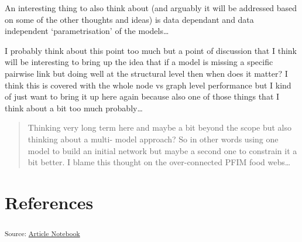 \documentclass[
  letterpaper,
  DIV=11,
  numbers=noendperiod]{scrartcl}
\begin{document}
An interesting thing to also think about (and arguably it will be
addressed based on some of the other thoughts and ideas) is data
dependant and data independent `parametrisation' of the models\ldots{}

I probably think about this point too much but a point of discussion
that I think will be interesting to bring up the idea that if a model is
missing a specific pairwise link but doing well at the structural level
then when does it matter? I think this is covered with the whole node vs
graph level performance but I kind of just want to bring it up here
again because also one of those things that I think about a bit too much
probably\ldots{}

\begin{quote}
Thinking very long term here and maybe a bit beyond the scope but also
thinking about a multi- model approach? So in other words using one
model to build an initial network but maybe a second one to constrain it
a bit better. I blame this thought on the over-connected PFIM food
webs\ldots{}
\end{quote}

\section*{References}\label{references}

\textsubscript{Source:
\href{https://BecksLab.github.io/ms_t_is_for_topology/index.qmd.html}{Article
Notebook}}
\end{document}
